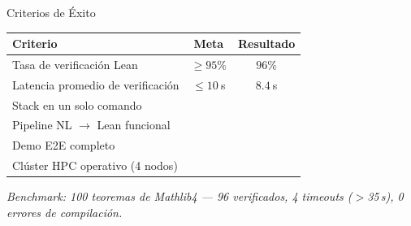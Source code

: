 \documentclass[aspectratio=169, 10pt]{beamer}
\newcommand{\yes}{\textcolor{cpTeal}{\checkmark}}
\begin{document}
\begin{frame}{Criterios de \'{E}xito}
  \vspace{0.3cm}
  \begin{center}
  \begin{tabular}{lcc}
    \toprule
    \textbf{Criterio}                    & \textbf{Meta}   & \textbf{Resultado}  \\
    \midrule
    Tasa de verificaci\'{o}n Lean        & $\geq 95\%$     & $96\%$ \yes         \\
    Latencia promedio de verificaci\'{o}n & $\leq 10\ $s   & $8.4\ $s \yes       \\
    Stack en un solo comando             & \yes            & \yes                \\
    Pipeline NL $\to$ Lean funcional     & \yes            & \yes                \\
    Demo E2E completo                    & \yes            & \yes                \\
    Cl\'{u}ster HPC operativo (4 nodos)  & \yes            & \yes                \\
    \bottomrule
  \end{tabular}
  \end{center}
  \vspace{0.4cm}
  {\small\color{cpGray}\textit{Benchmark: 100 teoremas de Mathlib4 ---
  96 verificados, 4 timeouts ($>$35\,s), 0 errores de compilaci\'{o}n.}}
\end{frame}
\end{document}
